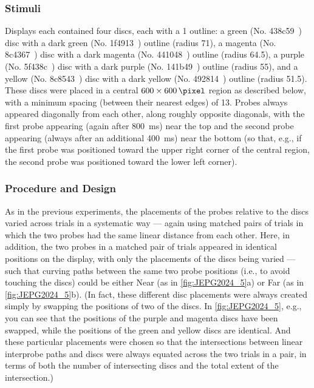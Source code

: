 \subsubsection{Stimuli}
Displays each contained four discs, each with a \qty{1}{\pixel} outline: a green (No. 438c59~) disc with a dark green (No. 1f4913~) outline (radius \qty{71}{\pixel}), a magenta (No. 8c4367~) disc with a dark magenta (No. 441048~) outline (radius \qty{64.5}{\pixel}), a purple (No. 5f438c~) disc with a dark purple (No. 141b49~) outline (radius \qty{55}{\pixel}), and a yellow (No. 8c8543~) disc with a dark yellow (No. 492814~) outline (radius \qty{51.5}{\pixel}). These discs were placed in a central $600\times \qty{600}{\pixel}$ region as described below, with a minimum spacing (between their nearest edges) of \qty{13}{\pixel}. Probes always appeared diagonally from each other, along roughly opposite diagonals, with the first probe appearing (again after \qty{800}{\milli\second}) near the top and the second probe appearing (always after an additional \qty{400}{\milli\second}) near the bottom (so that, e.g., if the first probe was positioned toward the upper right corner of the central region, the second probe was positioned toward the lower left corner).

\subsubsection{Procedure and Design}
As in the previous experiments, the placements of the probes relative to the discs varied across trials in a systematic way --- again using matched pairs of trials in which the two probes had the same linear distance from each other. Here, in addition, the two probes in a matched pair of trials appeared in identical positions on the display, with only the placements of the discs being varied --- such that curving paths between the same two probe positions (i.e., to avoid touching the discs) could be either Near (as in \cref{fig:JEPG2024_5}a) or Far (as in \cref{fig:JEPG2024_5}b). (In fact, these different disc placements were always created simply by swapping the positions of two of the discs. In \cref{fig:JEPG2024_5}, e.g., you can see that the positions of the purple and magenta discs have been swapped, while the positions of the green and yellow discs are identical. And these particular placements were chosen so that the intersections between linear interprobe paths and discs were always equated across the two trials in a pair, in terms of both the number of intersecting discs and the total extent of the intersection.)

